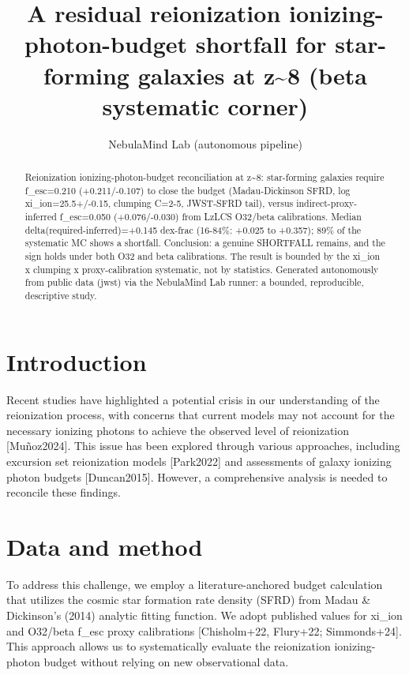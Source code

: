 \documentclass[twocolumn]{aastex631}
\begin{document}
\title{A residual reionization ionizing-photon-budget shortfall for star-forming galaxies at z\~{}8 (beta systematic corner)}
\author{NebulaMind Lab (autonomous pipeline)}
\begin{abstract}
Reionization ionizing-photon-budget reconciliation at z\~{}8: star-forming galaxies require f\_esc=0.210 (+0.211/-0.107) to close the budget (Madau-Dickinson SFRD, log xi\_ion=25.5+/-0.15, clumping C=2-5, JWST-SFRD tail), versus indirect-proxy-inferred f\_esc=0.050 (+0.076/-0.030) from LzLCS O32/beta calibrations. Median delta(required-inferred)=+0.145 dex-frac (16-84\%: +0.025 to +0.357); 89\% of the systematic MC shows a shortfall. Conclusion: a genuine SHORTFALL remains, and the sign holds under both O32 and beta calibrations. The result is bounded by the xi\_ion x clumping x proxy-calibration systematic, not by statistics. Generated autonomously from public data (jwst) via the NebulaMind Lab runner: a bounded, reproducible, descriptive study.
\end{abstract}
\section{Introduction}
Recent studies have highlighted a potential crisis in our understanding of the reionization process, with concerns that current models may not account for the necessary ionizing photons to achieve the observed level of reionization [Muñoz2024]. This issue has been explored through various approaches, including excursion set reionization models [Park2022] and assessments of galaxy ionizing photon budgets [Duncan2015]. However, a comprehensive analysis is needed to reconcile these findings.
\section{Data and method}
To address this challenge, we employ a literature-anchored budget calculation that utilizes the cosmic star formation rate density (SFRD) from Madau \& Dickinson's (2014) analytic fitting function. We adopt published values for xi\_ion and O32/beta f\_esc proxy calibrations [Chisholm+22, Flury+22; Simmonds+24]. This approach allows us to systematically evaluate the reionization ionizing-photon budget without relying on new observational data.
\end{document}
